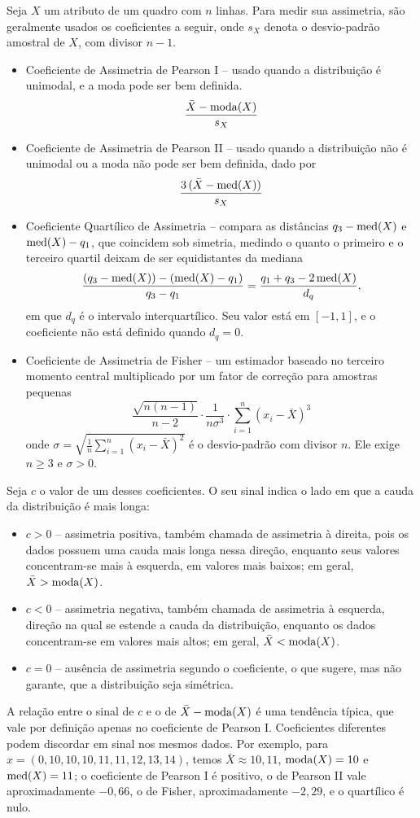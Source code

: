 Seja $X$ um atributo de um quadro com $n$ linhas.
Para medir sua assimetria, são geralmente usados os coeficientes a seguir, onde $s_X$ denota
o desvio-padrão amostral de $X$, com divisor $n-1$.
\begin{itemize}
\item Coeficiente de Assimetria de Pearson I -- usado quando a distribuição é
unimodal, e a moda pode ser bem definida.
\[
   \frac{\bar X - \mathrm{moda}\!\left(X\right)}{s_X}
\]

\item Coeficiente de Assimetria de Pearson II -- usado quando a distribuição não
é unimodal ou a moda não pode ser bem definida, dado por
\[
     \frac{3\,(\bar X - \mathrm{med}\!\left(X\right))}{s_X}
\]

\item Coeficiente Quartílico de Assimetria -- compara as distâncias $q_3 - \mathrm{med}\!\left(X\right)$ e
$\mathrm{med}\!\left(X\right) - q_1$, que coincidem sob simetria, medindo o quanto o primeiro e o terceiro quartil
deixam de ser equidistantes da mediana
\[
    \frac{(q_3 - \mathrm{med}\!\left(X\right)) - (\mathrm{med}\!\left(X\right) - q_1)}{q_3 - q_1}
        = \frac{q_1 + q_3 - 2\, \mathrm{med}\!\left(X\right)}{d_q},
\]
em que $d_q$ é o intervalo interquartílico.
Seu valor está em $[-1, 1]$, e o coeficiente não está definido quando $d_q = 0$.

\item Coeficiente de Assimetria de Fisher -- um estimador baseado no terceiro momento
central multiplicado por um fator de correção para amostras pequenas
\[
    \frac{\sqrt{n(n-1)}}{n-2} \cdot \frac{1}{n\sigma^3} \cdot \sum_{i=1}^n (x_i - \bar X)^3
\]
onde $\sigma = \sqrt{\frac 1 n \sum_{i=1}^n (x_i - \bar X)^2}$ é o desvio-padrão com divisor $n$.
Ele exige $n \ge 3$ e $\sigma > 0$.
\end{itemize}
Seja $c$ o valor de um desses coeficientes.
O seu sinal indica o lado em que a cauda da distribuição é mais longa:
\begin{itemize}
\item $c > 0$ -- assimetria positiva, também chamada de assimetria à direita, pois os
dados possuem uma cauda mais longa nessa direção, enquanto seus valores concentram-se
mais à esquerda, em valores mais baixos; em geral, $\bar X > \mathrm{moda}\!\left(X\right)$.

\item $c < 0$ -- assimetria negativa, também chamada de assimetria à esquerda, direção
na qual se estende a cauda da distribuição, enquanto os dados concentram-se em valores
mais altos; em geral, $\bar X < \mathrm{moda}\!\left(X\right)$.

\item $c = 0$ -- ausência de assimetria segundo o coeficiente, o que sugere, mas não
garante, que a distribuição seja simétrica.
\end{itemize}
A relação entre o sinal de $c$ e o de $\bar X - \mathrm{moda}\!\left(X\right)$ é uma tendência típica, que vale por
definição apenas no coeficiente de Pearson I.
Coeficientes diferentes podem discordar em sinal nos mesmos dados.
Por exemplo, para $x = (0, 10, 10, 10, 11, 11, 12, 13, 14)$, temos $\bar X \approx 10{,}11$,
$\mathrm{moda}\!\left(X\right) = 10$ e $\mathrm{med}\!\left(X\right) = 11$; o coeficiente de Pearson I é positivo, o de Pearson II vale
aproximadamente $-0{,}66$, o de Fisher, aproximadamente $-2{,}29$, e o quartílico é nulo.

